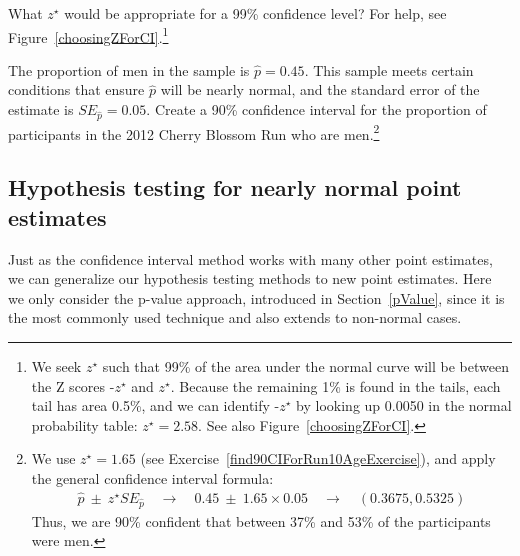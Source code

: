 \begin{exercise} \label{findZFor99PercConfLevelInFrameworkForInf}
What $z^{\star}$ would be appropriate for a 99\% confidence level? For help, see Figure~\vref{choosingZForCI}.\footnote{We seek $z^{\star}$ such that 99\% of the area under the normal curve will be between the Z scores -$z^{\star}$ and $z^{\star}$. Because the remaining 1\% is found in the tails, each tail has area 0.5\%, and we can identify -$z^{\star}$ by looking up 0.0050 in the normal probability table: $z^{\star} = 2.58$. See also Figure~\vref{choosingZForCI}.}
\end{exercise}

\begin{exercise}
The proportion of men in the  sample is $\hat{p}=0.45$. This sample meets certain conditions that ensure $\hat{p}$ will be nearly normal, and the standard error of the estimate is $SE_{\hat{p}}=0.05$. Create a 90\% confidence interval for the proportion of participants in the 2012 Cherry Blossom Run who are men.\footnote{We use $z^{\star}=1.65$ (see Exercise~\vref{find90CIForRun10AgeExercise}), and apply the general confidence interval formula:
\begin{eqnarray*}
\hat{p}\ \pm\ z^{\star}SE_{\hat{p}}
	\quad\to\quad 0.45\ \pm\ 1.65\times 0.05
	\quad\to\quad (0.3675, 0.5325)
\end{eqnarray*}
Thus, we are 90\% confident that between 37\% and 53\% of the participants were men.}
\end{exercise}


\subsection{Hypothesis testing for nearly normal point estimates}

Just as the confidence interval method works with many other point estimates, we can generalize our hypothesis testing methods to new point estimates. Here we only consider the p-value approach, introduced in Section~\ref{pValue}, since it is the most commonly used technique and also extends to non-normal cases.

